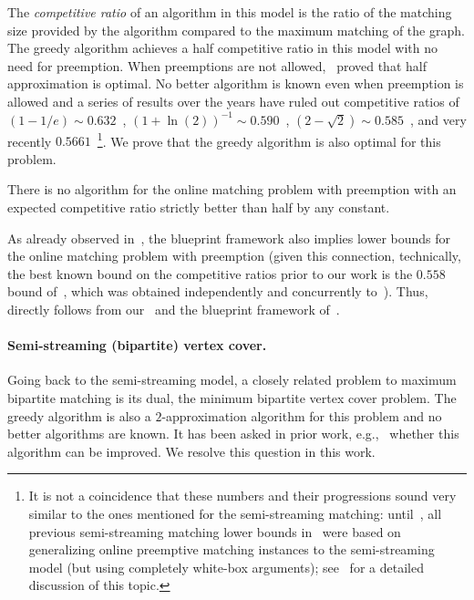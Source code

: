 The \emph{competitive ratio} of an algorithm in this model is the ratio of the matching size provided by the algorithm compared to the maximum matching of the graph. 
The greedy algorithm achieves a half competitive ratio in this model with no need for preemption. When preemptions are not allowed,~\cite{GamlathKMSW19} proved that  
half approximation is optimal. No better algorithm is known even when preemption is allowed and a series of results over the years have ruled out competitive ratios of 
$(1-1/e) \sim 0.632$~\cite{KarpVV90}, $(1+\ln{(2)})^{-1} \sim 0.590$~\cite{EpsteinLSW13}, $(2-\sqrt{2}) \sim 0.585$~\cite{HuangPTTWZ19}, and very recently $0.5661$~\cite{KissS26}\footnote{It is not a coincidence 
that these numbers and their progressions sound very similar to the ones mentioned for the semi-streaming matching: until~\cite{AssadiJX26}, all previous semi-streaming matching lower bounds in~\cite{GoelKK12,Kapralov13,Kapralov21} 
were based on generalizing online preemptive matching instances to the semi-streaming model (but using completely white-box arguments); see~\cite{Kapralov21} for a detailed discussion of this topic.}.
We prove that the greedy algorithm is also optimal for this problem. 

\begin{corollary}\label{cor:online}
	There is no algorithm for the online matching problem with preemption with an expected competitive ratio 
	strictly better than half by any constant. 
\end{corollary}

As already observed in~\cite{AssadiJX26}, the blueprint framework also implies lower bounds for the online matching problem with preemption (given this connection, technically, the best known bound on the competitive ratios 
prior to our work is the $0.558$ bound of~\cite{AssadiJX26}, which was obtained independently and concurrently to~\cite{KissS26}). Thus,~ directly follows from our~ and the 
blueprint framework of~\cite{AssadiJX26}. 



\paragraph{Semi-streaming (bipartite) vertex cover.} Going back to the semi-streaming model, a closely related problem to maximum bipartite matching is its dual, the minimum bipartite vertex cover problem. 
The greedy algorithm is also a $2$-approximation algorithm for this problem and no better algorithms are known. It has been asked in prior work, e.g.,~\cite{AssadiBBMS19,DerakhshanGR25} whether this algorithm can be improved. 
We resolve this question in this work. 

